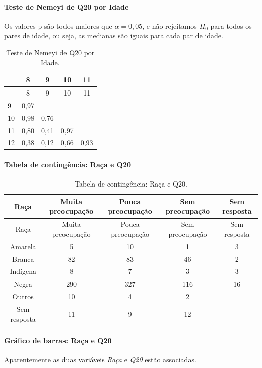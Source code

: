 \documentclass[]{article}
\let\oldparagraph\paragraph
\renewcommand{\paragraph}[1]{\oldparagraph{#1}\mbox{}}
\begin{document}
\hypertarget{teste-de-nemeyi-de-q20-por-idade}{%
\paragraph{Teste de Nemeyi de Q20 por Idade}\label{teste-de-nemeyi-de-q20-por-idade}}

Os valores-p são todos maiores que \(\alpha=0,05\), e não rejeitamos \(H_0\) para todos os pares de idade, ou seja, as medianas são iguais para cada par de idade.

\begin{longtable}[]{@{}lcccc@{}}
\caption{\label{tab:unnamed-chunk-308}Teste de Nemeyi de Q20 por Idade.}\tabularnewline
\toprule
& 8 & 9 & 10 & 11\tabularnewline
\midrule
\endfirsthead
\toprule
& 8 & 9 & 10 & 11\tabularnewline
\midrule
\endhead
9 & 0,97 & & &\tabularnewline
10 & 0,98 & 0,76 & &\tabularnewline
11 & 0,80 & 0,41 & 0,97 &\tabularnewline
12 & 0,38 & 0,12 & 0,66 & 0,93\tabularnewline
\bottomrule
\end{longtable}

\cleardoublepage

\hypertarget{tabela-de-continguxeancia-rauxe7a-e-q20}{%
\paragraph{Tabela de contingência: Raça e Q20}\label{tabela-de-continguxeancia-rauxe7a-e-q20}}

\begin{longtable}[]{@{}ccccc@{}}
\caption{\label{tab:unnamed-chunk-309}Tabela de contingência: Raça e Q20.}\tabularnewline
\toprule
Raça & Muita preocupação & Pouca preocupação & Sem preocupação & Sem resposta\tabularnewline
\midrule
\endfirsthead
\toprule
Raça & Muita preocupação & Pouca preocupação & Sem preocupação & Sem resposta\tabularnewline
\midrule
\endhead
Amarela & 5 & 10 & 1 & 3\tabularnewline
Branca & 82 & 83 & 46 & 2\tabularnewline
Indígena & 8 & 7 & 3 & 3\tabularnewline
Negra & 290 & 327 & 116 & 16\tabularnewline
Outros & 10 & 4 & 2 &\tabularnewline
Sem resposta & 11 & 9 & 12 &\tabularnewline
\bottomrule
\end{longtable}

\hypertarget{gruxe1fico-de-barras-rauxe7a-e-q20}{%
\paragraph{Gráfico de barras: Raça e Q20}\label{gruxe1fico-de-barras-rauxe7a-e-q20}}

Aparentemente as duas variáveis \emph{Raça} e \emph{Q20} estão associadas.
\end{document}

